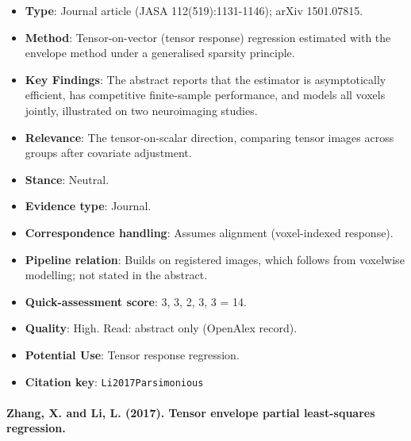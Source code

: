 \documentclass[journal,onecolumn]{IEEEtran}
\begin{document}
\begin{itemize}

\item{} \textbf{Type}: Journal article (JASA 112(519):1131-1146); arXiv 1501.07815.

\item{} \textbf{Method}: Tensor-on-vector (tensor response) regression estimated with the envelope method under a generalised sparsity principle.

\item{} \textbf{Key Findings}: The abstract reports that the estimator is asymptotically efficient, has competitive finite-sample performance, and models all voxels jointly, illustrated on two neuroimaging studies.

\item{} \textbf{Relevance}: The tensor-on-scalar direction, comparing tensor images across groups after covariate adjustment.

\item{} \textbf{Stance}: Neutral.

\item{} \textbf{Evidence type}: Journal.

\item{} \textbf{Correspondence handling}: Assumes alignment (voxel-indexed response).

\item{} \textbf{Pipeline relation}: Builds on registered images, which follows from voxelwise modelling; not stated in the abstract.

\item{} \textbf{Quick-assessment score}: 3, 3, 2, 3, 3 = 14.

\item{} \textbf{Quality}: High. Read: abstract only (OpenAlex record).

\item{} \textbf{Potential Use}: Tensor response regression.

\item{} \textbf{Citation key}: \texttt{Li2017Parsimonious}

\end{itemize}

\paragraph{Zhang, X. and Li, L. (2017). Tensor envelope partial least-squares regression.~\cite{Zhang2017Envelope}}\mbox{}
\end{document}
